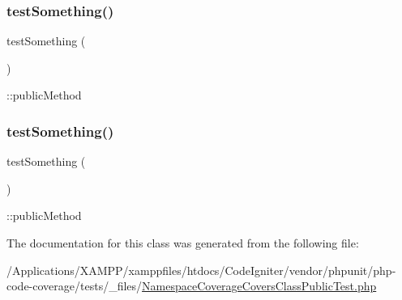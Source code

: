 \subsubsection{\texorpdfstring{test\+Something()}{testSomething()}\hspace{0.1cm}{\footnotesize\ttfamily [1/2]}}
{\footnotesize\ttfamily test\+Something (\begin{DoxyParamCaption}{ }\end{DoxyParamCaption})}

\+::public\+Method \mbox{\label{class_namespace_coverage_covers_class_public_test_a0fc4e17369bc9607ebdd850d9eda8167}} 
\subsubsection{\texorpdfstring{test\+Something()}{testSomething()}\hspace{0.1cm}{\footnotesize\ttfamily [2/2]}}
{\footnotesize\ttfamily test\+Something (\begin{DoxyParamCaption}{ }\end{DoxyParamCaption})}

\+::public\+Method 

The documentation for this class was generated from the following file\+:\begin{DoxyCompactItemize}
\item 
/\+Applications/\+X\+A\+M\+P\+P/xamppfiles/htdocs/\+Code\+Igniter/vendor/phpunit/php-\/code-\/coverage/tests/\+\_\+files/\mbox{\hyperlink{php-code-coverage_2tests_2__files_2_namespace_coverage_covers_class_public_test_8php}{Namespace\+Coverage\+Covers\+Class\+Public\+Test.\+php}}\end{DoxyCompactItemize}
